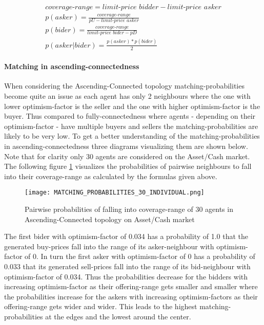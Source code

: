 \documentclass[Bachelorarbeit.tex]{subfiles}
\begin{document}
\begin{equation}
\begin{split}
\textit{coverage-range} = \textit{limit-price bidder} - \textit{limit-price asker} \\
p(asker) = \frac{\textit{coverage-range}}{ pU - \textit{limit-price asker} } \\
p(bider) = \frac{\textit{coverage-range}}{ \textit{limit-price bider} - pD } \\
p(asker | bider) = \frac{p(asker) * p(bider)}{2}
\end{split}
\end{equation}

\paragraph{Matching in ascending-connectedness}
When considering the Ascending-Connected topology matching-probabilities become quite an issue as each agent has only 2 neighbours where the one with lower optimism-factor is the seller and the one with higher optimism-factor is the buyer. Thus compared to fully-connectedness where agents - depending on their optimism-factor - have multiple buyers and sellers the matching-probabilities are likely to be very low. To get a better understanding of the matching-probabilities in ascending-connectedness three diagrams visualizing them are shown below. Note that for clarity only 30 agents are considered on the Asset/Cash market.
\medskip
The following figure \ref{fig:MATCHING_PROBABILITIES_30_INDIVIDUAL} visualizes the probabilities of pairwise neighbours to fall into their coverage-range as calculated by the formulas given above.

\begin{figure}[H]
	\centering
  \texttt{[image: MATCHING\_PROBABILITIES\_30\_INDIVIDUAL.png]}
	\caption{Pairwise probabilities of falling into coverage-range of 30 agents in Ascending-Connected topology on Asset/Cash market}
	\label{fig:MATCHING_PROBABILITIES_30_INDIVIDUAL}
\end{figure}

The first bider with optimism-factor of 0.034 has a probability of 1.0 that the generated buy-prices fall into the range of its asker-neighbour with optimism-factor of 0. In turn the first asker with optimism-factor of 0 has a probability of 0.033 that its generated sell-prices fall into the range of its bid-neighbour with optimism-factor of 0.034. Thus the probabilities decrease for the bidders with increasing optimism-factor as their offering-range gets smaller and smaller where the probabilities increase for the askers with increasing optimism-factors as their offering-range gets wider and wider. This leads to the highest matching-probabilities at the edges and the lowest around the center.
\end{document}
